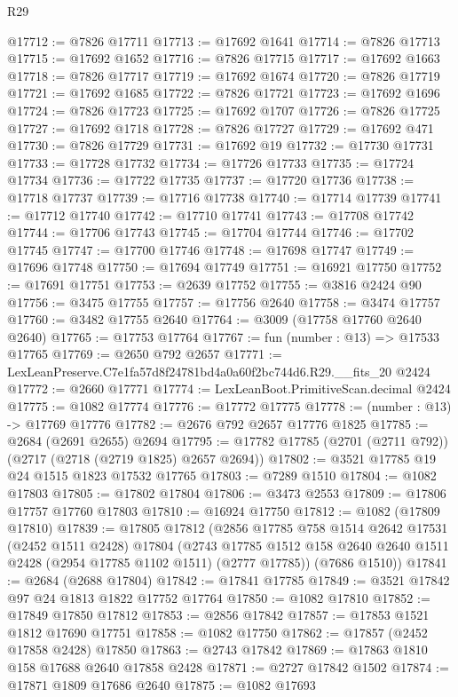 \begin{lexlean}{R29}
\begin{coremodule}
@17712 := @7826 @17711
@17713 := @17692 @1641
@17714 := @7826 @17713
@17715 := @17692 @1652
@17716 := @7826 @17715
@17717 := @17692 @1663
@17718 := @7826 @17717
@17719 := @17692 @1674
@17720 := @7826 @17719
@17721 := @17692 @1685
@17722 := @7826 @17721
@17723 := @17692 @1696
@17724 := @7826 @17723
@17725 := @17692 @1707
@17726 := @7826 @17725
@17727 := @17692 @1718
@17728 := @7826 @17727
@17729 := @17692 @471
@17730 := @7826 @17729
@17731 := @17692 @19
@17732 := @17730 @17731
@17733 := @17728 @17732
@17734 := @17726 @17733
@17735 := @17724 @17734
@17736 := @17722 @17735
@17737 := @17720 @17736
@17738 := @17718 @17737
@17739 := @17716 @17738
@17740 := @17714 @17739
@17741 := @17712 @17740
@17742 := @17710 @17741
@17743 := @17708 @17742
@17744 := @17706 @17743
@17745 := @17704 @17744
@17746 := @17702 @17745
@17747 := @17700 @17746
@17748 := @17698 @17747
@17749 := @17696 @17748
@17750 := @17694 @17749
@17751 := @16921 @17750
@17752 := @17691 @17751
@17753 := @2639 @17752
@17755 := @3816 @2424 @90
@17756 := @3475 @17755
@17757 := @17756 @2640
@17758 := @3474 @17757
@17760 := @3482 @17755 @2640
@17764 := @3009 (@17758 @17760 @2640 @2640)
@17765 := @17753 @17764
@17767 := fun (number : @13) => @17533 @17765
@17769 := @2650 @792 @2657
@17771 := LexLeanPreserve.C7e1fa57d8f24781bd4a0a60f2bc744d6.R29.__fits_20 @2424
@17772 := @2660 @17771
@17774 := LexLeanBoot.PrimitiveScan.decimal @2424
@17775 := @1082 @17774
@17776 := @17772 @17775
@17778 := (number : @13) -> @17769 @17776
@17782 := @2676 @792 @2657 @17776 @1825
@17785 := @2684 (@2691 @2655) @2694
@17795 := @17782 @17785 (@2701 (@2711 @792)) (@2717 (@2718 (@2719 @1825) @2657 @2694))
@17802 := @3521 @17785 @19 @24 @1515 @1823 @17532 @17765
@17803 := @7289 @1510
@17804 := @1082 @17803
@17805 := @17802 @17804
@17806 := @3473 @2553
@17809 := @17806 @17757 @17760 @17803
@17810 := @16924 @17750
@17812 := @1082 (@17809 @17810)
@17839 := @17805
    @17812
    (@2856
      @17785
      @758
      @1514
      @2642
      @17531
      (@2452 @1511 @2428)
      @17804
      (@2743 @17785 @1512 @158 @2640 @2640 @1511 @2428 (@2954 @17785 @1102 @1511) (@2777 @17785))
      (@7686 @1510))
@17841 := @2684 (@2688 @17804)
@17842 := @17841 @17785
@17849 := @3521 @17842 @97 @24 @1813 @1822 @17752 @17764
@17850 := @1082 @17810
@17852 := @17849 @17850 @17812
@17853 := @2856 @17842
@17857 := @17853 @1521 @1812 @17690 @17751
@17858 := @1082 @17750
@17862 := @17857 (@2452 @17858 @2428) @17850
@17863 := @2743 @17842
@17869 := @17863 @1810 @158 @17688 @2640 @17858 @2428
@17871 := @2727 @17842 @1502
@17874 := @17871 @1809 @17686 @2640
@17875 := @1082 @17693

\end{coremodule}
\end{lexlean}
